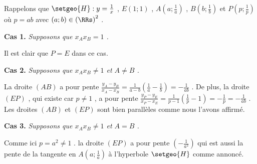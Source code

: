 Rappelons que $\setgeo{H} : y = \frac{1}{x}$ , $E(1 ; 1)$ , $A \left( a ; \frac{1}{a} \right)$ , $B \left( b ; \frac{1}{b} \right)$ et $P \left( p ; \frac{1}{p} \right)$ où $p = a b$ avec $(a ; b) \in \left( \RRs \right)^2$ .



\bigskip

\textbf{Cas 1.} \emph{Supposons que $x_A x_B = 1$ .}

\medskip

Il est clair que $P = E$ dans ce cas.



\bigskip

\textbf{Cas 2.} \emph{Supposons que $x_A x_B \neq 1$ et $A \neq B$ .}

\medskip

La droite $(AB)$ a pour pente
$\frac{y_A - y_B}{x_A - x_B} = \frac{1}{a - b} \left( \frac{1}{a} - \frac{1}{b} \right) = - \frac{1}{ab}$ .
De plus, la droite $(EP)$ , qui existe car $p \neq 1$ , a pour pente
$\frac{y_P - y_E}{x_P - x_E} = \frac{1}{p - 1} \left( \frac{1}{p} - 1 \right) = - \frac{1}{p} = - \frac{1}{ab}$ .
Les droites $(AB)$ et $(EP)$ sont bien parallèles comme nous l'avons affirmé.



\bigskip

\textbf{Cas 3.} \emph{Supposons que $x_A x_B \neq 1$ et $A = B$ .}

\medskip

Comme ici $p = a^2 \neq 1$ . la droite $(EP)$ a pour pente $\left( - \frac{1}{a^2} \right)$ qui est aussi la pente de la tangente en $A \left( a ; \frac{1}{a} \right)$ à l'hyperbole $\setgeo{H}$ comme annoncé. 